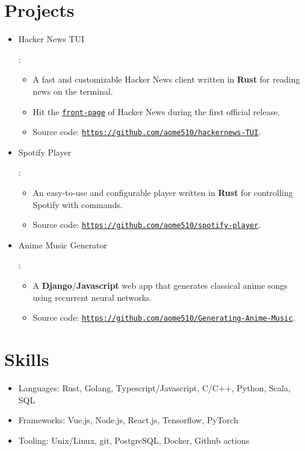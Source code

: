 \documentclass[letterpaper,11pt]{article}
\newcommand{\linkDesc}[1]{\underline{\texttt{#1}}}
\newcommand{\resumeItem}[2]{
  \item\small{#1{: #2}} \vspace{-2pt}
}
\newcommand{\resumeSubItem}[2]{\resumeItem{#1}{#2} \vspace{-2pt}}
\newcommand{\resumeDescItem}[1]{\item[-]\small{#1} \vspace{-2pt}}
\newcommand{\resumeListStart}{\vspace{-2pt}\begin{itemize}[leftmargin=*]}
\newcommand{\resumeListEnd}{\end{itemize}}
\begin{document}
\section{Projects}
  \resumeListStart
    \resumeItem{Hacker News TUI}
    {\vspace{-5pt}
      \resumeListStart
      \resumeDescItem{A fast and customizable Hacker News client written in \textbf{Rust} for reading news on the terminal.}
      \resumeDescItem{Hit the \href{https://news.ycombinator.com/item?id=26929588}{\linkDesc{front-page}} of Hacker News during the first official release.}
      \resumeDescItem{Source code: \href{https://github.com/aome510/hackernews-TUI}{\linkDesc{https://github.com/aome510/hackernews-TUI}}.}
    \resumeListEnd}
    \vspace{-5pt}
    \resumeItem{Spotify Player}
    {\vspace{-5pt}
      \resumeListStart
      \resumeDescItem{An easy-to-use and configurable player written in \textbf{Rust} for controlling Spotify with commands.}
      \resumeDescItem{Source code: \href{https://github.com/aome510/spotify-player}{\linkDesc{https://github.com/aome510/spotify-player}}.}
    \resumeListEnd}
    \vspace{-5pt}
    \resumeItem{Anime Music Generator}
    {\vspace{-5pt}
      \resumeListStart
      \resumeDescItem{A \textbf{Django}/\textbf{Javascript} web app  that generates classical anime songs using recurrent neural networks.}
      \resumeDescItem{Source code: \href{https://github.com/aome510/Generating-Anime-Music}{\linkDesc{https://github.com/aome510/Generating-Anime-Music}}.}
    \resumeListEnd}
    \vspace{-5pt}
  \resumeListEnd

\section{Skills}
  \resumeListStart
    \resumeSubItem{Languages}{Rust, Golang, Typescript/Javascript, C/C++, Python, Scala, SQL}
    \resumeSubItem{Frameworks}{Vue.js, Node.js, React.js, Tensorflow, PyTorch}
    \resumeSubItem{Tooling}{Unix/Linux, git, PostgreSQL, Docker, Github actions}
  \resumeListEnd

\end{document}
